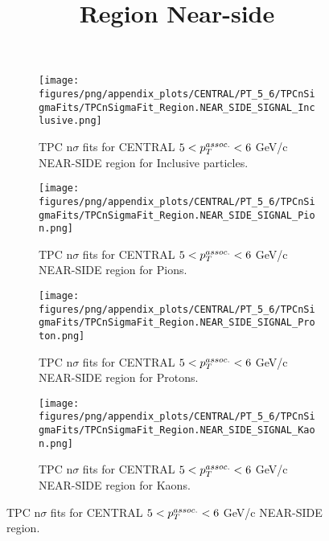             \begin{figure}[H]
                \title{Region Near-side}
                \begin{subfigure}[b]{0.5\textwidth}
                    \centering
                    \texttt{[image: figures/png/appendix\_plots/CENTRAL/PT\_5\_6/TPCnSigmaFits/TPCnSigmaFit\_Region.NEAR\_SIDE\_SIGNAL\_Inclusive.png]}
                    \caption{TPC n$\sigma$ fits for CENTRAL $5 < \pTassoc < 6$ GeV/c NEAR-SIDE region for Inclusive particles.}
                    \label{fig:appendix_CENTRAL_$5 < \pTassoc < 6$ GeV/c_NEAR_SIDE_SIGNAL_Inclusive}
                \end{subfigure}
                \begin{subfigure}[b]{0.5\textwidth}
                    \centering
                    \texttt{[image: figures/png/appendix\_plots/CENTRAL/PT\_5\_6/TPCnSigmaFits/TPCnSigmaFit\_Region.NEAR\_SIDE\_SIGNAL\_Pion.png]}
                    \caption{TPC n$\sigma$ fits for CENTRAL $5 < \pTassoc < 6$ GeV/c NEAR-SIDE region for Pions.}
                    \label{fig:appendix_CENTRAL_$5 < \pTassoc < 6$ GeV/c_NEAR_SIDE_SIGNAL_Pion}
                \end{subfigure}
                \begin{subfigure}[b]{0.5\textwidth}
                    \centering
                    \texttt{[image: figures/png/appendix\_plots/CENTRAL/PT\_5\_6/TPCnSigmaFits/TPCnSigmaFit\_Region.NEAR\_SIDE\_SIGNAL\_Proton.png]}
                    \caption{TPC n$\sigma$ fits for CENTRAL $5 < \pTassoc < 6$ GeV/c NEAR-SIDE region for Protons.}
                    \label{fig:appendix_CENTRAL_$5 < \pTassoc < 6$ GeV/c_NEAR_SIDE_SIGNAL_Proton}
                \end{subfigure}
                \begin{subfigure}[b]{0.5\textwidth}
                    \centering
                    \texttt{[image: figures/png/appendix\_plots/CENTRAL/PT\_5\_6/TPCnSigmaFits/TPCnSigmaFit\_Region.NEAR\_SIDE\_SIGNAL\_Kaon.png]}
                    \caption{TPC n$\sigma$ fits for CENTRAL $5 < \pTassoc < 6$ GeV/c NEAR-SIDE region for Kaons.}
                    \label{fig:appendix_CENTRAL_$5 < \pTassoc < 6$ GeV/c_NEAR_SIDE_SIGNAL_Kaon}
                \end{subfigure}
                \caption{TPC n$\sigma$ fits for CENTRAL $5 < \pTassoc < 6$ GeV/c NEAR-SIDE region.}
                \label{fig:appendix_CENTRAL_$5 < \pTassoc < 6$ GeV/c_NEAR_SIDE_SIGNAL}
            \end{figure}
